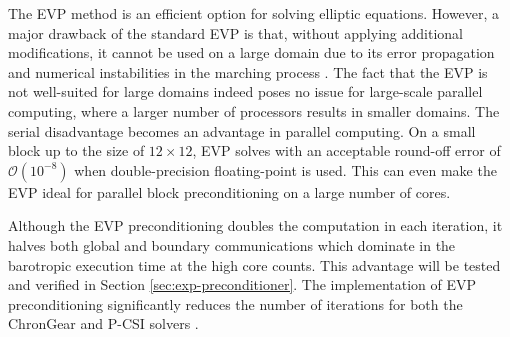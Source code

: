 The EVP method is an efficient option for solving elliptic equations. However, a major drawback of the standard EVP is that, without applying additional modifications, it cannot be used on a large domain due to its error propagation and numerical instabilities in the marching process \citep{roache1995elliptic}.
The fact that the EVP is not well-suited for large domains indeed poses no issue for large-scale parallel computing, where a larger number of processors results in smaller domains.
The serial disadvantage becomes an advantage in parallel computing. On a small block up to the size of $12\times 12$, EVP solves with an acceptable round-off error of $\mathcal{O}(10^{-8})$ when double-precision floating-point is used.
This can even make the EVP ideal for parallel block preconditioning on a large number of cores.

Although the EVP preconditioning doubles the computation in each iteration, it halves both global and boundary communications which dominate in the barotropic execution time at the high core counts. This advantage will be tested and verified in Section \ref{sec:exp-preconditioner}.
The implementation of EVP preconditioning significantly reduces the number of iterations for both the ChronGear and P-CSI solvers \citep{hu2015improving}.

